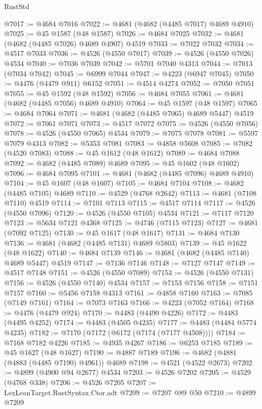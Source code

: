 \begin{lexlean}{RustStd}
\begin{coremodule}
@7017 := @4684 @7016
@7022 := @4681 (@4682 (@4485 @7017) @4689 @4910)
@7025 := @45 @1587 (@48 @1587)
@7026 := @4684 @7025
@7032 := @4681 (@4682 (@4485 @7026) @4689 @4907) @4519
@7033 := @7022 @7032
@7034 := @4517 @7033
@7036 := @4526 (@4550 @7017)
@7039 := @4526 (@4550 @7026) @4534
@7040 := @7036 @7039
@7042 := @5701 @7040 @4313
@7044 := @7013 (@7034 @7042)
@7045 := @6999 @7044
@7047 := @4223 (@6947 @7045)
@7050 := @4476 (@4479 @911) @6152
@7051 := @4514 @4274
@7052 := @7050 @7051
@7055 := @45 @1592 (@48 @1592)
@7056 := @4684 @7055
@7061 := @4681 (@4682 (@4485 @7056) @4689 @4910)
@7064 := @45 @1597 (@48 @1597)
@7065 := @4684 @7064
@7071 := @4681 (@4682 (@4485 @7065) @4689 @5447) @4519
@7072 := @7061 @7071
@7073 := @4517 @7072
@7075 := @4526 (@4550 @7056)
@7078 := @4526 (@4550 @7065) @4534
@7079 := @7075 @7078
@7081 := @5597 @7079 @4313
@7082 := @5353 @7081
@7083 := @4858 @5608
@7085 := @7082 (@4520 @7083)
@7088 := @45 @1612 (@48 @1612)
@7089 := @4684 @7088
@7092 := @4682 (@4485 @7089) @4689
@7095 := @45 @1602 (@48 @1602)
@7096 := @4684 @7095
@7101 := @4681 (@4682 (@4485 @7096) @4689 @4910)
@7104 := @45 @1607 (@48 @1607)
@7105 := @4684 @7104
@7108 := @4682 (@4485 @7105) @4689
@7110 := @4529 (@4768 @2642)
@7113 := @4681 (@7108 @7110) @4519
@7114 := @7101 @7113
@7115 := @4517 @7114
@7117 := @4526 (@4550 @7096)
@7120 := @4526 (@4550 @7105) @4534
@7121 := @7117 @7120
@7123 := @5634 @7121 @4368
@7125 := @4746 (@7115 @7123)
@7127 := @4681 (@7092 @7125)
@7130 := @45 @1617 (@48 @1617)
@7131 := @4684 @7130
@7136 := @4681 (@4682 (@4485 @7131) @4689 @5803)
@7139 := @45 @1622 (@48 @1622)
@7140 := @4684 @7139
@7146 := @4681 (@4682 (@4485 @7140) @4689 @5447) @4519
@7147 := @7136 @7146
@7148 := @7127 @7147
@7149 := @4517 @7148
@7151 := @4526 (@4550 @7089)
@7153 := @4526 (@4550 @7131)
@7156 := @4526 (@4550 @7140) @4534
@7157 := @7153 @7156
@7158 := @7151 @7157
@7160 := @5456 @7158 @4313
@7161 := @4858 @7160
@7163 := @7085 (@7149 @7161)
@7164 := @7073 @7163
@7166 := @4223 (@7052 @7164)
@7168 := @4476 (@4479 @924)
@7170 := @4483 (@4490 @4226)
@7172 := @4483 (@4495 @4252)
@7174 := @4483 (@4505 @4235)
@7177 := @4483 (@4484 @5774 @4235)
@7182 := @7170 (@7172 (@6172 (@7174 (@7177 @4508))))
@7184 := @7168 @7182 @4226
@7185 := @4935 @4267
@7186 := @6253 @7185
@7189 := @45 @1627 (@48 @1627)
@7190 := @4887 @7189
@7196 := @4682 (@4881 (@4883 (@4485 @7190) @4961)) @4689
@7198 := @4521 (@4522 @2673)
@7202 := @4899 (@4900 @94 @2677) @4534
@7203 := @4526 @7202
@7205 := @4529 (@4768 @338)
@7206 := @4526 @7205
@7207 := LexLeanTarget.RustSyntax.Ctor.adt
@7209 := @7207 @89 @50
@7210 := @4899 @7209

\end{coremodule}
\end{lexlean}
